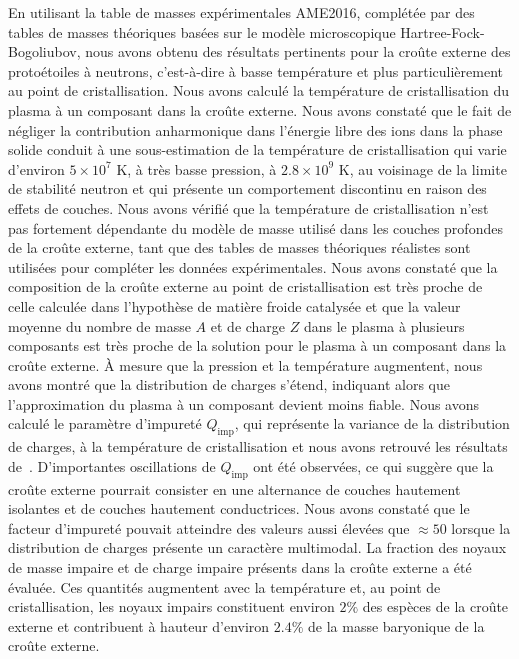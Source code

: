 En utilisant la table de masses expérimentales AME2016, complétée par des 
tables de masses théoriques basées sur le modèle microscopique 
Hartree-Fock-Bogoliubov, nous avons obtenu des résultats pertinents pour la 
croûte externe des protoétoiles à neutrons, c'est-à-dire à basse température et 
plus particulièrement au point de cristallisation. 
%
Nous avons calculé la température de cristallisation du plasma à un composant 
dans la croûte externe. Nous avons constaté que le fait de négliger la 
contribution anharmonique dans l'énergie libre des ions dans la phase solide 
conduit à une sous-estimation de la température de cristallisation qui 
varie d'environ $5 \times 10^7$ K, à très basse pression, à $2.8 \times 10^9$
K, au voisinage de la limite de stabilité neutron et qui présente un 
comportement discontinu en raison des effets de couches. 
Nous avons vérifié que la température de cristallisation n'est pas fortement 
dépendante du modèle de masse utilisé dans les couches profondes de la croûte 
externe, tant que des tables de masses théoriques réalistes sont utilisées pour 
compléter les données expérimentales.
%
Nous avons constaté que la composition de la croûte externe au point de 
cristallisation est très proche de celle calculée dans l'hypothèse de matière
froide catalysée et que la valeur moyenne du nombre de masse $A$ et de charge 
$Z$ dans le plasma à plusieurs composants est très proche de la solution pour
le plasma à un composant dans la croûte externe. 
À mesure que la pression et la température augmentent, nous avons montré que la 
distribution de charges s'étend, indiquant alors que l'approximation du plasma 
à un composant devient moins fiable. 
%
Nous avons calculé le paramètre d'impureté $Q_{\text{imp}}$, qui 
représente la variance de la distribution de charges, à la température de 
cristallisation et nous avons retrouvé les résultats de~\cite{Fantina2020}. 
D'importantes oscillations de $Q_{\text{imp}}$ ont été observées, ce qui 
suggère que la croûte externe pourrait consister en une alternance de 
couches hautement isolantes et de couches hautement conductrices. Nous 
avons constaté que le facteur d'impureté pouvait atteindre des valeurs aussi 
élevées que $\approx 50$ lorsque la distribution de charges présente un 
caractère multimodal. 
%
La fraction des noyaux de masse impaire et de charge impaire présents dans la 
croûte externe a été évaluée. Ces quantités augmentent avec la température et, 
au point de cristallisation, les noyaux impairs constituent environ $2\%$ des 
espèces de la croûte externe et contribuent à hauteur d'environ $2.4\%$ de la 
masse baryonique de la croûte externe. 

